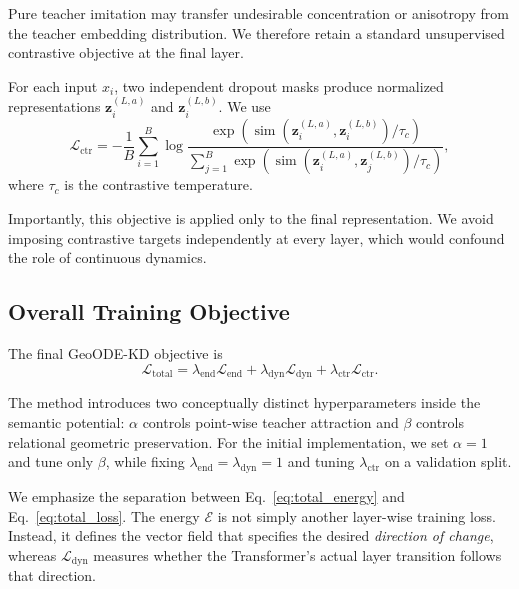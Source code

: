 \documentclass[11pt]{article}
\begin{document}
Pure teacher imitation may transfer undesirable concentration or
anisotropy from the teacher embedding distribution. We therefore retain a
standard unsupervised contrastive objective at the final layer.

For each input $x_i$, two independent dropout masks produce normalized
representations
$\mathbf{z}^{(L,a)}_i$ and $\mathbf{z}^{(L,b)}_i$.
We use
\begin{equation}
    \mathcal{L}_{\mathrm{ctr}}
    =
    -
    \frac{1}{B}
    \sum_{i=1}^{B}
    \log
    \frac{
        \exp
        \left(
            \operatorname{sim}
            (
                \mathbf{z}^{(L,a)}_i,
                \mathbf{z}^{(L,b)}_i
            )/\tau_c
        \right)
    }{
        \sum_{j=1}^{B}
        \exp
        \left(
            \operatorname{sim}
            (
                \mathbf{z}^{(L,a)}_i,
                \mathbf{z}^{(L,b)}_j
            )/\tau_c
        \right)
    },
    \label{eq:contrastive}
\end{equation}
where $\tau_c$ is the contrastive temperature.

Importantly, this objective is applied only to the final representation.
We avoid imposing contrastive targets independently at every layer, which
would confound the role of continuous dynamics.


\subsection{Overall Training Objective}\label{sec:objective}

The final GeoODE-KD objective is
\begin{equation}
    \boxed{
    \mathcal{L}_{\mathrm{total}}
    =
    \lambda_{\mathrm{end}}
    \mathcal{L}_{\mathrm{end}}
    +
    \lambda_{\mathrm{dyn}}
    \mathcal{L}_{\mathrm{dyn}}
    +
    \lambda_{\mathrm{ctr}}
    \mathcal{L}_{\mathrm{ctr}}
    }.
    \label{eq:total_loss}
\end{equation}

The method introduces two conceptually distinct hyperparameters inside the
semantic potential:
$\alpha$ controls point-wise teacher attraction and $\beta$ controls
relational geometric preservation.
For the initial implementation, we set $\alpha=1$ and tune only $\beta$,
while fixing
$\lambda_{\mathrm{end}}=\lambda_{\mathrm{dyn}}=1$ and tuning
$\lambda_{\mathrm{ctr}}$ on a validation split.

We emphasize the separation between
Eq.~\eqref{eq:total_energy} and Eq.~\eqref{eq:total_loss}.
The energy
$\mathcal{E}$ is not simply another layer-wise training loss.
Instead, it defines the vector field that specifies the desired
\emph{direction of change}, whereas
$\mathcal{L}_{\mathrm{dyn}}$ measures whether the Transformer's actual
layer transition follows that direction.
\end{document}
